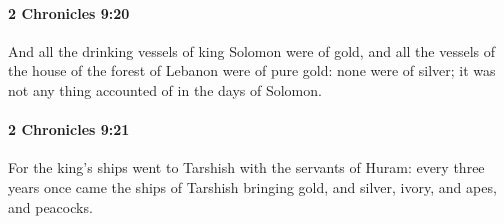 		\paragraph{2 Chronicles 9:20} %
			\label{2CHRONICLES-9-20}

			And all the drinking vessels of king Solomon were of gold, and all the vessels of the house of the forest of Lebanon were of pure gold: none were of silver; it was not any thing accounted of in the days of Solomon.


		\paragraph{2 Chronicles 9:21} %
			\label{2CHRONICLES-9-21}

			For the king's ships went to Tarshish with the servants of Huram: every three years once came the ships of Tarshish bringing gold, and silver, ivory, and apes, and peacocks.

